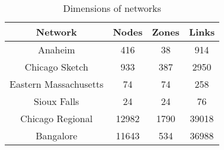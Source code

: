 \begin{table}[h!]
\caption{Dimensions of networks}
\label{table:networksdim}
\center
\begin{tabular}{|c|c|c|c|}
\hline
Network	&	Nodes	&	Zones	&	Links\\
\hline
Anaheim		&	416	&	38	&	914\\	
Chicago Sketch	&	933	&	387	&	2950\\
Eastern Massachusetts	&	74	&	74	&	258\\	
Sioux Falls	&	24	&	24	&	76\\
Chicago Regional	&	12982	&	1790	&	39018\\
Bangalore	&	11643	&	534	&	36988\\	
\hline
\end{tabular}
\end{table}
